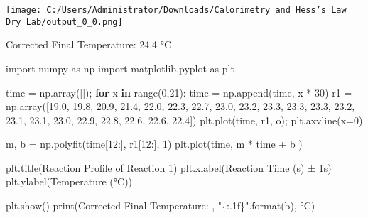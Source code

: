 \documentclass[
]{article}
\newenvironment{Shaded}{}{}
\newcommand{\BuiltInTok}[1]{#1}
\newcommand{\ControlFlowTok}[1]{\textcolor[rgb]{0.00,0.44,0.13}{\textbf{#1}}}
\newcommand{\DecValTok}[1]{\textcolor[rgb]{0.25,0.63,0.44}{#1}}
\newcommand{\FloatTok}[1]{\textcolor[rgb]{0.25,0.63,0.44}{#1}}
\newcommand{\ImportTok}[1]{#1}
\newcommand{\KeywordTok}[1]{\textcolor[rgb]{0.00,0.44,0.13}{\textbf{#1}}}
\newcommand{\NormalTok}[1]{#1}
\newcommand{\OperatorTok}[1]{\textcolor[rgb]{0.40,0.40,0.40}{#1}}
\newcommand{\SpecialCharTok}[1]{\textcolor[rgb]{0.25,0.44,0.63}{#1}}
\newcommand{\StringTok}[1]{\textcolor[rgb]{0.25,0.44,0.63}{#1}}
\begin{document}
\texttt{[image: C:/Users/Administrator/Downloads/Calorimetry and Hess's Law Dry Lab/output\_0\_0.png]}

\begin{Shaded}
\begin{Highlighting}[]
\NormalTok{Corrected Final Temperature:  24.4 °C}
\end{Highlighting}
\end{Shaded}

\begin{Shaded}
\begin{Highlighting}[]
\ImportTok{import}\NormalTok{ numpy }\ImportTok{as}\NormalTok{ np}
\ImportTok{import}\NormalTok{ matplotlib.pyplot }\ImportTok{as}\NormalTok{ plt}

\NormalTok{time }\OperatorTok{=}\NormalTok{ np.array([])}\OperatorTok{;}
\ControlFlowTok{for}\NormalTok{ x }\KeywordTok{in} \BuiltInTok{range}\NormalTok{(}\DecValTok{0}\NormalTok{,}\DecValTok{21}\NormalTok{):}
\NormalTok{    time }\OperatorTok{=}\NormalTok{ np.append(time, x }\OperatorTok{*} \DecValTok{30}\NormalTok{)}
\NormalTok{r1 }\OperatorTok{=}\NormalTok{ np.array([}\FloatTok{19.0}\NormalTok{, }\FloatTok{19.8}\NormalTok{, }\FloatTok{20.9}\NormalTok{, }\FloatTok{21.4}\NormalTok{, }\FloatTok{22.0}\NormalTok{, }\FloatTok{22.3}\NormalTok{, }\FloatTok{22.7}\NormalTok{, }\FloatTok{23.0}\NormalTok{, }\FloatTok{23.2}\NormalTok{, }\FloatTok{23.3}\NormalTok{, }\FloatTok{23.3}\NormalTok{, }\FloatTok{23.3}\NormalTok{, }\FloatTok{23.2}\NormalTok{, }\FloatTok{23.1}\NormalTok{, }\FloatTok{23.1}\NormalTok{, }\FloatTok{23.0}\NormalTok{, }\FloatTok{22.9}\NormalTok{, }\FloatTok{22.8}\NormalTok{, }\FloatTok{22.6}\NormalTok{, }\FloatTok{22.6}\NormalTok{, }\FloatTok{22.4}\NormalTok{])}
\NormalTok{plt.plot(time, r1, }\StringTok{\textquotesingle{}o\textquotesingle{}}\NormalTok{)}\OperatorTok{;}
\NormalTok{plt.axvline(x}\OperatorTok{=}\DecValTok{0}\NormalTok{)}

\NormalTok{m, b }\OperatorTok{=}\NormalTok{ np.polyfit(time[}\DecValTok{12}\NormalTok{:], r1[}\DecValTok{12}\NormalTok{:], }\DecValTok{1}\NormalTok{)}
\NormalTok{plt.plot(time, m }\OperatorTok{*}\NormalTok{ time }\OperatorTok{+}\NormalTok{ b )}


\NormalTok{plt.title(}\StringTok{\textquotesingle{}Reaction Profile of Reaction 1\textquotesingle{}}\NormalTok{)}
\NormalTok{plt.xlabel(}\StringTok{\textquotesingle{}Reaction Time (s) ± 1s\textquotesingle{}}\NormalTok{)}
\NormalTok{plt.ylabel(}\StringTok{\textquotesingle{}Temperature (°C)\textquotesingle{}}\NormalTok{)}

\NormalTok{plt.show()}
\BuiltInTok{print}\NormalTok{(}\StringTok{\textquotesingle{}Corrected Final Temperature: \textquotesingle{}}\NormalTok{, }\StringTok{"}\SpecialCharTok{\{:.1f\}}\StringTok{"}\NormalTok{.}\BuiltInTok{format}\NormalTok{(b), }\StringTok{\textquotesingle{}°C\textquotesingle{}}\NormalTok{) }
\end{Highlighting}
\end{Shaded}
\end{document}
